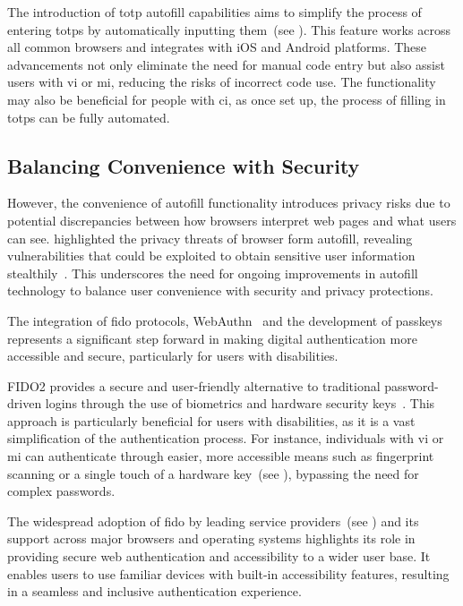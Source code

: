 The introduction of \ac{totp} autofill capabilities aims to simplify the process of entering \acp{totp} by automatically inputting them~(see ). This feature works across all common browsers and integrates with iOS and Android platforms. These advancements not only eliminate the need for manual code entry but also assist users with \ac{vi} or \ac{mi}, reducing the risks of incorrect code use. The functionality may also be beneficial for people with \ac{ci}, as once set up, the process of filling in \acp{totp} can be fully automated.

\subsection{Balancing Convenience with Security}
\label{sec:future:balancing}

However, the convenience of autofill functionality introduces privacy risks due to potential discrepancies between how browsers interpret web pages and what users can see. \citeauthor{lin_2020} highlighted the privacy threats of browser form autofill, revealing vulnerabilities that could be exploited to obtain sensitive user information stealthily~\cite{lin_2020}. This underscores the need for ongoing improvements in autofill technology to balance user convenience with security and privacy protections.

The integration of \ac{fido} protocols, WebAuthn~\cite{webauthn_2021} and the development of passkeys represents a significant step forward in making digital authentication more accessible and secure, particularly for users with disabilities.

FIDO2 provides a secure and user-friendly alternative to traditional password-driven logins through the use of biometrics and hardware security keys~\cite{webauthn_2021}. This approach is particularly beneficial for users with disabilities, as it is a vast simplification of the authentication process. For instance, individuals with \ac{vi} or \ac{mi} can authenticate through easier, more accessible means such as fingerprint scanning or a single touch of a hardware key~(see ), bypassing the need for complex passwords.

The widespread adoption of \ac{fido} by leading service providers~(see ) and its support across major browsers and operating systems highlights its role in providing secure web authentication and accessibility to a wider user base. It enables users to use familiar devices with built-in accessibility features, resulting in a seamless and inclusive authentication experience.


